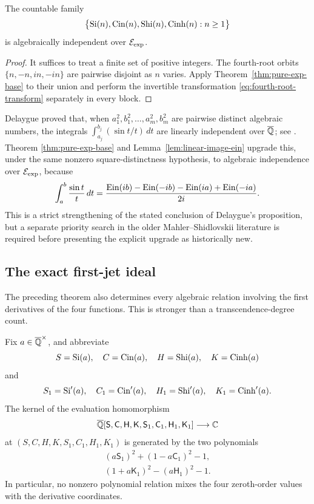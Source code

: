 \begin{corollary}
\label{cor:integer-integral-family}
The countable family
\begin{equation}\label{eq:integer-integral-family}
 \bigl\{\operatorname{Si}(n),\operatorname{Cin}(n),\operatorname{Shi}(n),\operatorname{Cinh}(n):n\ge1\bigr\}
\end{equation}
is algebraically independent over \(\mathcal E_{\mathrm{exp}}\).
\end{corollary}

\begin{proof}
It suffices to treat a finite set of positive integers.  The fourth-root
orbits \(\{n,-n,in,-in\}\) are pairwise disjoint as \(n\) varies.  Apply
Theorem~\ref{thm:pure-exp-base} to their union and perform the invertible
transformation \eqref{eq:fourth-root-transform} separately in every block.
\end{proof}

\begin{remark}
Delaygue proved that, when
\(a_1^2,b_1^2,\ldots,a_m^2,b_m^2\) are pairwise distinct algebraic
numbers, the integrals
\(\int_{a_j}^{b_j}(\sin t/t)\,dt\) are linearly independent over
\(\overline{\mathbb Q}\); see \cite[Proposition~4.4]{Delaygue2025}.  Theorem
\ref{thm:pure-exp-base} and Lemma~\ref{lem:linear-image-ein} upgrade this,
under the same nonzero square-distinctness hypothesis, to algebraic
independence over \(\mathcal E_{\mathrm{exp}}\), because
\[
 \int_a^b\frac{\sin t}{t}\,dt
 =\frac{\operatorname{Ein}(ib)-\operatorname{Ein}(-ib)-\operatorname{Ein}(ia)+\operatorname{Ein}(-ia)}{2i}.
\]
This is a strict strengthening of the stated conclusion of Delaygue's
proposition, but a separate priority search in the older
Mahler--Shidlovskii literature is required before presenting the explicit
upgrade as historically new.
\end{remark}

\subsection{The exact first-jet ideal}

The preceding theorem also determines every algebraic relation involving
the first derivatives of the four functions.  This is stronger than a
transcendence-degree count.

\begin{theorem}\label{thm:first-jet-ideal}
Fix \(a\in\overline{\mathbb Q}^\times\), and abbreviate
\[
 S=\operatorname{Si}(a),\quad C=\operatorname{Cin}(a),\quad H=\operatorname{Shi}(a),\quad K=\operatorname{Cinh}(a)
\]
and
\[
 S_1=\operatorname{Si}'(a),\quad C_1=\operatorname{Cin}'(a),\quad
 H_1=\operatorname{Shi}'(a),\quad K_1=\operatorname{Cinh}'(a).
\]
The kernel of the evaluation homomorphism
\[
 \overline{\mathbb Q}[\mathsf S,\mathsf C,\mathsf H,\mathsf K,
       \mathsf S_1,\mathsf C_1,\mathsf H_1,\mathsf K_1]
 \longrightarrow\mathbb C
\]
at \((S,C,H,K,S_1,C_1,H_1,K_1)\) is generated by the two polynomials
\begin{align}
 (a\mathsf S_1)^2+(1-a\mathsf C_1)^2-1,
 \label{eq:trig-jet-relation}\\
 (1+a\mathsf K_1)^2-(a\mathsf H_1)^2-1.
 \label{eq:hyperbolic-jet-relation}
\end{align}
In particular, no nonzero polynomial relation mixes the four zeroth-order
values with the derivative coordinates.
\end{theorem}

